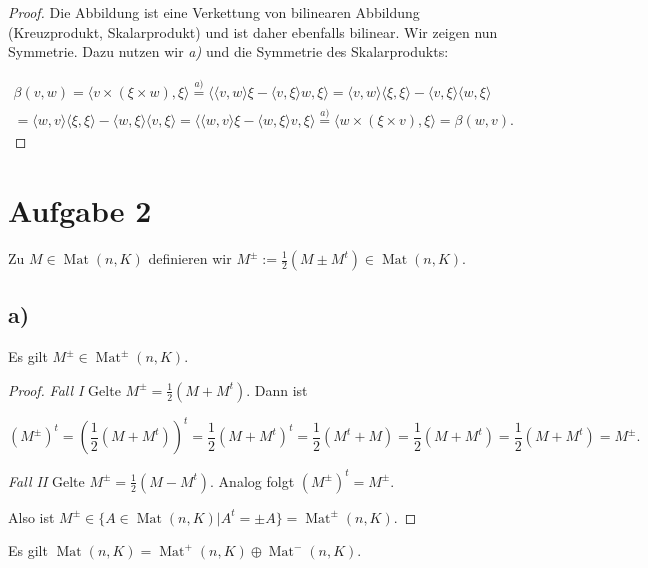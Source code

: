 \documentclass{article}
\DeclareMathOperator{\Mat}{Mat}
\begin{document}
 \begin{proof}
    Die Abbildung ist eine Verkettung von
    bilinearen Abbildung (Kreuzprodukt, Skalarprodukt)
    und ist daher ebenfalls bilinear.
    Wir zeigen nun Symmetrie.
    Dazu nutzen wir \textit{a)} und die Symmetrie des Skalarprodukts:

    \[
    \begin{aligned}
    \beta(v, w)
    =
    \langle v \times (\xi \times w), \xi \rangle
    \overset{a)}{=}
    \langle\langle v, w \rangle \xi - \langle v, \xi \rangle w, \xi\rangle
    =
    \langle v, w \rangle \langle \xi, \xi\rangle - \langle v, \xi \rangle \langle w, \xi \rangle
    \\
    =
    \langle w, v \rangle \langle \xi, \xi\rangle - \langle w, \xi \rangle \langle v, \xi \rangle   
    =
    \langle\langle w, v \rangle \xi - \langle w, \xi \rangle v, \xi\rangle
    \overset{a)}{=}
    \langle w \times (\xi \times v), \xi \rangle
    =
    \beta(w, v).
    \end{aligned}
    \]
 \end{proof}

 \newpage
 \section*{Aufgabe 2}
 Zu $M \in \Mat(n, K)$ definieren wir
 $M^{\pm} := \frac{1}{2}(M \pm M^t) \in \Mat(n, K)$.

 \subsection*{a)}
 Es gilt $M^{\pm} \in \Mat^{\pm}(n, K)$.

\begin{proof}
    \textit{Fall I} Gelte $M^{\pm} = \frac{1}{2}(M + M^t)$.
    Dann ist

    \[
    (M^{\pm})^t = (\frac{1}{2}(M + M^t))^t
    =
    \frac{1}{2}(M + M^t)^t
    =
    \frac{1}{2}(M^t + M)
    =
    \frac{1}{2}(M + M^t)
    =
    \frac{1}{2}(M + M^t)
    =
    M^{\pm}.
    \]

    \textit{Fall II} Gelte $M^{\pm} = \frac{1}{2}(M - M^t)$.
    Analog folgt $(M^{\pm})^t = M^{\pm}$.

    Also ist $M^{\pm} \in \{ A \in \Mat(n,K)| A^t = \pm A\}  = \Mat^{\pm}(n, K)$.
\end{proof}

\bigbreak\bigbreak

Es gilt $\Mat(n,K) = \Mat^+(n, K) \oplus \Mat^-(n, K)$.
\end{document}
